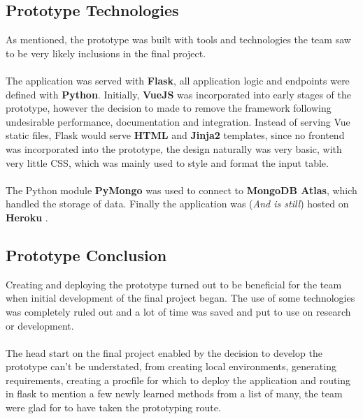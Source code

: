 \subsection{Prototype Technologies}
As mentioned, the prototype was built with tools and technologies the team saw to be very likely inclusions in the final project. 

\paragraph{}
The application was served with \textbf{Flask}, all application logic and endpoints were defined with \textbf{Python}. Initially, \textbf{VueJS} was incorporated into early stages of the prototype, however the decision to made to remove the framework following undesirable performance, documentation and integration. Instead of serving Vue static files, Flask would serve \textbf{HTML} and \textbf{Jinja2} templates, since no frontend was incorporated into the prototype, the design naturally was very basic, with very little CSS, which was mainly used to style and format the input table.

\paragraph{}
The Python module \textbf{PyMongo} was used to connect to \textbf{MongoDB Atlas}, which handled the storage of data. Finally the application was (\textit{And is still}) hosted on \textbf{Heroku} \cite{PROTOTYPE_HEROKU}. 

\subsection{Prototype Conclusion}
Creating and deploying the prototype turned out to be beneficial for the team when initial development of the final project began. The use of some technologies was completely ruled out and a lot of time was saved and put to use on research or development. 

\paragraph{}
The head start on the final project enabled by the decision to develop the prototype can't be understated, from creating local environments, generating requirements, creating a procfile for which to deploy the application and routing in flask to mention a few newly learned methods from a list of many, the team were glad for to have taken the prototyping route.

